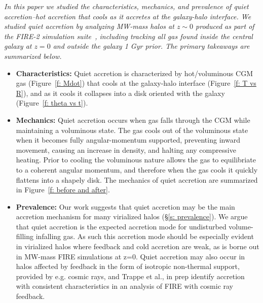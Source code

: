 \documentclass[fleqn,usenatbib]{mnras}
\begin{document}
\textit{
In this paper we studied the characteristics, mechanics, and prevalence of quiet accretion--hot accretion that cools as it accretes at the galaxy-halo interface.
We studied quiet accretion by analyzing MW-mass halos at $z \sim 0$ produced as part of the FIRE-2 simulation suite~\cite{Hopkins2018}, including tracking all gas found inside the central galaxy at $z=0$ and outside the galaxy 1 Gyr prior.
The primary takeaways are summarized below.
}
\begin{itemize}
    \item \textbf{Characteristics:} Quiet accretion is characterized by hot/voluminous CGM gas (Figure~\ref{f: Mdot}) that cools at the galaxy-halo interface (Figure~\ref{f: T vs R}), and as it cools it collapses into a disk oriented with the galaxy (Figure~\ref{f: theta vs t}).
    \item \textbf{Mechanics:} Quiet accretion occurs when gas falls through the CGM while maintaining a voluminous state.
    The gas cools out of the voluminous state when it becomes fully angular-momentum supported, preventing inward movement, causing an increase in density, and halting any compressive heating.
    Prior to cooling the voluminous nature allows the gas to equilibriate to a coherent angular momentum, and therefore when the gas cools it quickly flattens into a shapely disk.
    The mechanics of quiet accretion are summarized in Figure~\ref{f: before and after}.
    \item \textbf{Prevalence:} Our work suggests that quiet accretion may be the main accretion mechanism for many virialized halos (\S\ref{s: prevalence}).
    We argue that quiet accretion is the expected accretion mode for undisturbed volume-filling infalling gas.
    As such this accretion mode should be especially evident in virialized halos where feedback and cold accretion are weak, as is borne out in MW-mass FIRE simulations at z=0.
    Quiet accretion may also occur in halos affected by feedback in the form of isotropic non-thermal support, provided by e.g. cosmic rays, and Trappe et al., in prep identify accretion with consistent characteristics in an analysis of FIRE with cosmic ray feedback.
\end{itemize}
\end{document}
